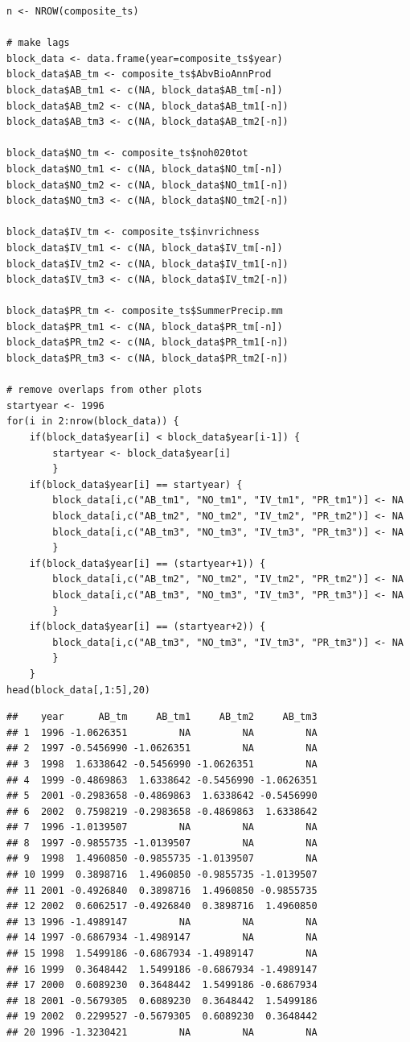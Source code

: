 \begin{lstlisting}
n <- NROW(composite_ts)

# make lags
block_data <- data.frame(year=composite_ts$year)
block_data$AB_tm <- composite_ts$AbvBioAnnProd
block_data$AB_tm1 <- c(NA, block_data$AB_tm[-n])
block_data$AB_tm2 <- c(NA, block_data$AB_tm1[-n])
block_data$AB_tm3 <- c(NA, block_data$AB_tm2[-n])

block_data$NO_tm <- composite_ts$noh020tot
block_data$NO_tm1 <- c(NA, block_data$NO_tm[-n])
block_data$NO_tm2 <- c(NA, block_data$NO_tm1[-n])
block_data$NO_tm3 <- c(NA, block_data$NO_tm2[-n])

block_data$IV_tm <- composite_ts$invrichness
block_data$IV_tm1 <- c(NA, block_data$IV_tm[-n])
block_data$IV_tm2 <- c(NA, block_data$IV_tm1[-n])
block_data$IV_tm3 <- c(NA, block_data$IV_tm2[-n])

block_data$PR_tm <- composite_ts$SummerPrecip.mm
block_data$PR_tm1 <- c(NA, block_data$PR_tm[-n])
block_data$PR_tm2 <- c(NA, block_data$PR_tm1[-n])
block_data$PR_tm3 <- c(NA, block_data$PR_tm2[-n])

# remove overlaps from other plots
startyear <- 1996
for(i in 2:nrow(block_data)) {
    if(block_data$year[i] < block_data$year[i-1]) {
        startyear <- block_data$year[i]
        }
    if(block_data$year[i] == startyear) {
        block_data[i,c("AB_tm1", "NO_tm1", "IV_tm1", "PR_tm1")] <- NA
        block_data[i,c("AB_tm2", "NO_tm2", "IV_tm2", "PR_tm2")] <- NA
        block_data[i,c("AB_tm3", "NO_tm3", "IV_tm3", "PR_tm3")] <- NA
        }
    if(block_data$year[i] == (startyear+1)) {
        block_data[i,c("AB_tm2", "NO_tm2", "IV_tm2", "PR_tm2")] <- NA
        block_data[i,c("AB_tm3", "NO_tm3", "IV_tm3", "PR_tm3")] <- NA
        }
    if(block_data$year[i] == (startyear+2)) {
        block_data[i,c("AB_tm3", "NO_tm3", "IV_tm3", "PR_tm3")] <- NA
        }
    }
head(block_data[,1:5],20)
\end{lstlisting}

\begin{lstlisting}[backgroundcolor=\color{white}, commentstyle=\ttfamily]
##    year      AB_tm     AB_tm1     AB_tm2     AB_tm3
## 1  1996 -1.0626351         NA         NA         NA
## 2  1997 -0.5456990 -1.0626351         NA         NA
## 3  1998  1.6338642 -0.5456990 -1.0626351         NA
## 4  1999 -0.4869863  1.6338642 -0.5456990 -1.0626351
## 5  2001 -0.2983658 -0.4869863  1.6338642 -0.5456990
## 6  2002  0.7598219 -0.2983658 -0.4869863  1.6338642
## 7  1996 -1.0139507         NA         NA         NA
## 8  1997 -0.9855735 -1.0139507         NA         NA
## 9  1998  1.4960850 -0.9855735 -1.0139507         NA
## 10 1999  0.3898716  1.4960850 -0.9855735 -1.0139507
## 11 2001 -0.4926840  0.3898716  1.4960850 -0.9855735
## 12 2002  0.6062517 -0.4926840  0.3898716  1.4960850
## 13 1996 -1.4989147         NA         NA         NA
## 14 1997 -0.6867934 -1.4989147         NA         NA
## 15 1998  1.5499186 -0.6867934 -1.4989147         NA
## 16 1999  0.3648442  1.5499186 -0.6867934 -1.4989147
## 17 2000  0.6089230  0.3648442  1.5499186 -0.6867934
## 18 2001 -0.5679305  0.6089230  0.3648442  1.5499186
## 19 2002  0.2299527 -0.5679305  0.6089230  0.3648442
## 20 1996 -1.3230421         NA         NA         NA
\end{lstlisting}

